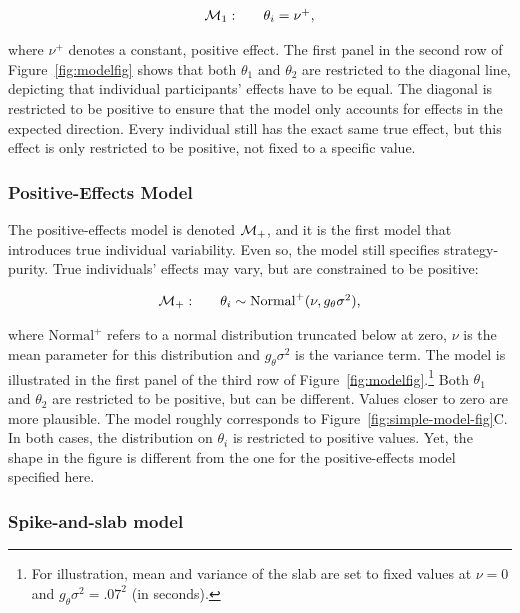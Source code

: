 \documentclass[english,man]{apa6}
\theoremstyle{definition}
\theoremstyle{definition}
\theoremstyle{remark}
\begin{document}
\[
  \begin{array}{llr}
{\cal M}_1: && \theta_i = \nu^+,\\
\end{array}
\]

where \(\nu^+\) denotes a constant, positive effect. The first panel in
the second row of Figure~\ref{fig:modelfig} shows that both \(\theta_1\)
and \(\theta_2\) are restricted to the diagonal line, depicting that
individual participants' effects have to be equal. The diagonal is
restricted to be positive to ensure that the model only accounts for
effects in the expected direction. Every individual still has the exact
same true effect, but this effect is only restricted to be positive, not
fixed to a specific value.

\subsubsection{Positive-Effects Model}\label{positive-effects-model}

The positive-effects model is denoted \({\cal M}_+\), and it is the first
model that introduces true individual variability. Even so, the model
still specifies strategy-purity. True individuals' effects may vary, but
are constrained to be positive:

\[
  \begin{array}{llr}
{\cal M}_+: && \theta_i \sim \mbox{Normal}^+(\nu, g_\theta \sigma^2),\\
\end{array}
\]

where \(\mbox{Normal}^+\) refers to a normal distribution truncated
below at zero, \(\nu\) is the mean parameter for this distribution and
\(g_\theta \sigma^2\) is the variance term. The model is illustrated in
the first panel of the third row of Figure~\ref{fig:modelfig}.\footnote{For
  illustration, mean and variance of the slab are set to fixed values at
  \(\nu = 0\) and \(g_\theta \sigma^2 = .07^2\) (in seconds).} Both
\(\theta_1\) and \(\theta_2\) are restricted to be positive, but can be
different. Values closer to zero are more plausible. The model roughly
corresponds to Figure~\ref{fig:simple-model-fig}C. In both cases, the
distribution on \(\theta_i\) is restricted to positive values. Yet, the
shape in the figure is different from the one for the positive-effects
model specified here.

\subsubsection{Spike-and-slab model}\label{spike-and-slab-model}
\end{document}
